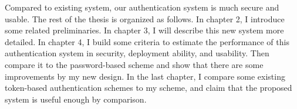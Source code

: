 \begin{CJK}{Bg5}{bsmi}
Compared to existing system, our authentication system is much secure and usable. The rest of the thesis is organized as follows. In chapter 2, I introduce some related preliminaries. In chapter 3, I will describe this new system more detailed. In chapter 4, I build some criteria to estimate the performance of this authentication system in security, deployment ability, and usability. Then compare it to the password-based scheme and show that there are some improvements by my new design. In the last chapter, I compare some existing token-based authentication schemes to my scheme, and claim that the proposed system is useful enough by comparison.

\end{CJK}
